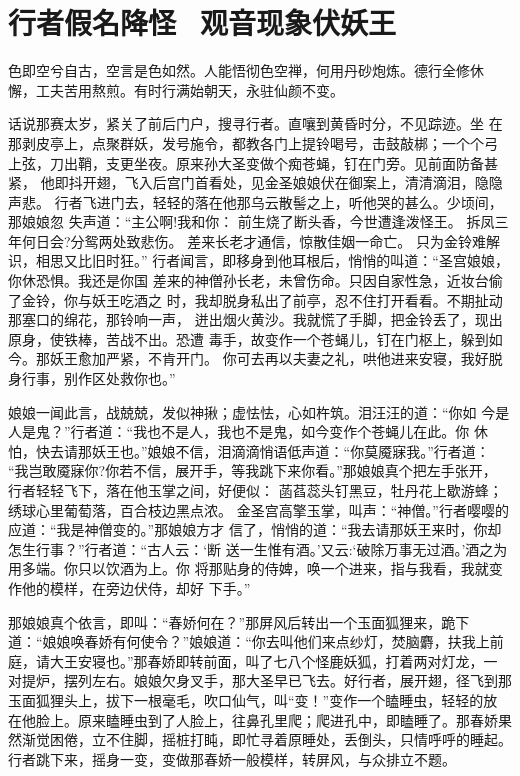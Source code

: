 \chapter{行者假名降怪~观音现象伏妖王}

色即空兮自古，空言是色如然。人能悟彻色空禅，何用丹砂炮炼。德行全修休
懈，工夫苦用熬煎。有时行满始朝天，永驻仙颜不变。

话说那赛太岁，紧关了前后门户，搜寻行者。直嚷到黄昏时分，不见踪迹。坐
在那剥皮亭上，点聚群妖，发号施令，都教各门上提铃喝号，击鼓敲梆；一个个弓
上弦，刀出鞘，支更坐夜。原来孙大圣变做个痴苍蝇，钉在门旁。见前面防备甚紧，
他即抖开翅，飞入后宫门首看处，见金圣娘娘伏在御案上，清清滴泪，隐隐声悲。
行者飞进门去，轻轻的落在他那乌云散髻之上，听他哭的甚么。少顷间，那娘娘忽
失声道：“主公啊!我和你：
前生烧了断头香，今世遭逢泼怪王。
拆凤三年何日会?分鸳两处致悲伤。
差来长老才通信，惊散佳姻一命亡。
只为金铃难解识，相思又比旧时狂。”
行者闻言，即移身到他耳根后，悄悄的叫道：“圣宫娘娘，你休恐惧。我还是你国
差来的神僧孙长老，未曾伤命。只因自家性急，近妆台偷了金铃，你与妖王吃酒之
时，我却脱身私出了前亭，忍不住打开看看。不期扯动那塞口的绵花，那铃响一声，
迸出烟火黄沙。我就慌了手脚，把金铃丢了，现出原身，使铁棒，苦战不出。恐遭
毒手，故变作一个苍蝇儿，钉在门枢上，躲到如今。那妖王愈加严紧，不肯开门。
你可去再以夫妻之礼，哄他进来安寝，我好脱身行事，别作区处救你也。”

娘娘一闻此言，战兢兢，发似神揪；虚怯怯，心如杵筑。泪汪汪的道：“你如
今是人是鬼？”行者道：“我也不是人，我也不是鬼，如今变作个苍蝇儿在此。你
休怕，快去请那妖王也。”娘娘不信，泪滴滴悄语低声道：“你莫魇寐我。”行者道：
“我岂敢魇寐你?你若不信，展开手，等我跳下来你看。”那娘娘真个把左手张开，
行者轻轻飞下，落在他玉掌之间，好便似：
菡萏蕊头钉黑豆，牡丹花上歇游蜂；
绣球心里葡萄落，百合枝边黑点浓。
金圣宫高擎玉掌，叫声：“神僧。”行者嘤嘤的应道：“我是神僧变的。”那娘娘方才
信了，悄悄的道：“我去请那妖王来时，你却怎生行事？”行者道：“古人云：‘断
送一生惟有酒。’又云:‘破除万事无过酒。’酒之为用多端。你只以饮酒为上。你
将那贴身的侍婢，唤一个进来，指与我看，我就变作他的模样，在旁边伏侍，却好
下手。”

那娘娘真个依言，即叫：“春娇何在？”那屏风后转出一个玉面狐狸来，跪下
道：“娘娘唤春娇有何使令？”娘娘道：“你去叫他们来点纱灯，焚脑麝，扶我上前
庭，请大王安寝也。”那春娇即转前面，叫了七八个怪鹿妖狐，打着两对灯龙，一
对提炉，摆列左右。娘娘欠身叉手，那大圣早已飞去。好行者，展开翅，径飞到那
玉面狐狸头上，拔下一根毫毛，吹口仙气，叫“变！”变作一个瞌睡虫，轻轻的放
在他脸上。原来瞌睡虫到了人脸上，往鼻孔里爬；爬进孔中，即瞌睡了。那春娇果
然渐觉困倦，立不住脚，摇桩打盹，即忙寻着原睡处，丢倒头，只情呼呼的睡起。
行者跳下来，摇身一变，变做那春娇一般模样，转屏风，与众排立不题。

